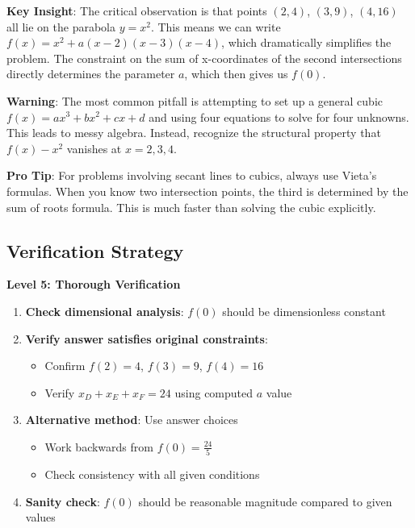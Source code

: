 \documentclass[]{article}
\begin{document}
\begin{keyinsightbox}
\textbf{Key Insight}: The critical observation is that points $(2,4)$, $(3,9)$, $(4,16)$ all lie on the parabola $y = x^2$. This means we can write $f(x) = x^2 + a(x-2)(x-3)(x-4)$, which dramatically simplifies the problem. The constraint on the sum of x-coordinates of the second intersections directly determines the parameter $a$, which then gives us $f(0)$.
\end{keyinsightbox}

\begin{warningbox}
\textbf{Warning}: The most common pitfall is attempting to set up a general cubic $f(x) = ax^3 + bx^2 + cx + d$ and using four equations to solve for four unknowns. This leads to messy algebra. Instead, recognize the structural property that $f(x) - x^2$ vanishes at $x = 2, 3, 4$.
\end{warningbox}

\begin{tipbox}
\textbf{Pro Tip}: For problems involving secant lines to cubics, always use Vieta's formulas. When you know two intersection points, the third is determined by the sum of roots formula. This is much faster than solving the cubic explicitly.
\end{tipbox}

\begin{verificationbox}
\subsection*{Verification Strategy}

\textbf{Level 5: Thorough Verification}

\begin{enumerate}
    \item \textbf{Check dimensional analysis}: $f(0)$ should be dimensionless constant
    \item \textbf{Verify answer satisfies original constraints}:
    \begin{itemize}
        \item Confirm $f(2) = 4$, $f(3) = 9$, $f(4) = 16$
        \item Verify $x_D + x_E + x_F = 24$ using computed $a$ value
    \end{itemize}
    \item \textbf{Alternative method}: Use answer choices
    \begin{itemize}
        \item Work backwards from $f(0) = \frac{24}{5}$
        \item Check consistency with all given conditions
    \end{itemize}
    \item \textbf{Sanity check}: $f(0)$ should be reasonable magnitude compared to given values
\end{enumerate}
\end{verificationbox}
\end{document}
